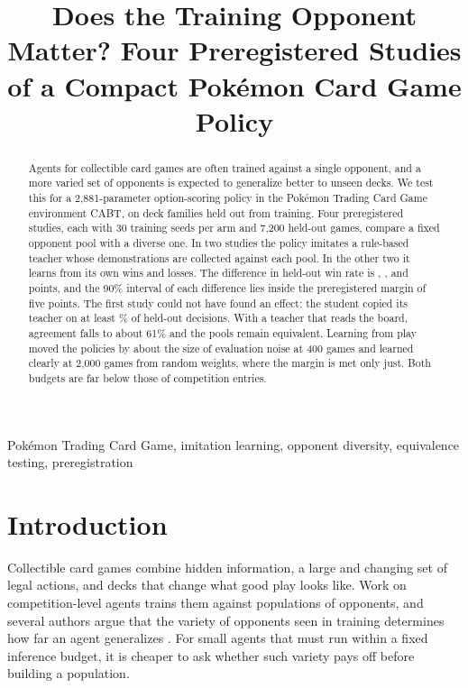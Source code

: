 \documentclass[conference]{IEEEtran}
\begin{document}
\title{Does the Training Opponent Matter? Four Preregistered Studies of a Compact Pok\'emon Card Game Policy}

\author{
}

\maketitle

\begin{abstract}
Agents for collectible card games are often trained against a single opponent, and a more varied set of opponents is expected to generalize better to unseen decks. We test this for a 2,881-parameter option-scoring policy in the Pok\'emon Trading Card Game environment CABT, on deck families held out from training. Four preregistered studies, each with 30 training seeds per arm and 7,200 held-out games, compare a fixed opponent pool with a diverse one. In two studies the policy imitates a rule-based teacher whose demonstrations are collected against each pool. In the other two it learns from its own wins and losses. The difference in held-out win rate is \ADelta, \BDelta, \CDelta{} and \DDelta{} points, and the 90\% interval of each difference lies inside the preregistered margin of five points. The first study could not have found an effect: the student copied its teacher on at least \AAgreeMin\% of held-out decisions. With a teacher that reads the board, agreement falls to about 61\% and the pools remain equivalent. Learning from play moved the policies by about the size of evaluation noise at 400 games and learned clearly at 2,000 games from random weights, where the margin is met only just. Both budgets are far below those of competition entries.
\end{abstract}

\begin{IEEEkeywords}
Pok\'emon Trading Card Game, imitation learning, opponent diversity, equivalence testing, preregistration
\end{IEEEkeywords}

\section{Introduction}

Collectible card games combine hidden information, a large and changing set of legal actions, and decks that change what good play looks like. Work on competition-level agents trains them against populations of opponents, and several authors argue that the variety of opponents seen in training determines how far an agent generalizes \cite{Lanctot17,Strouse21}. For small agents that must run within a fixed inference budget, it is cheaper to ask whether such variety pays off before building a population.
\end{document}
